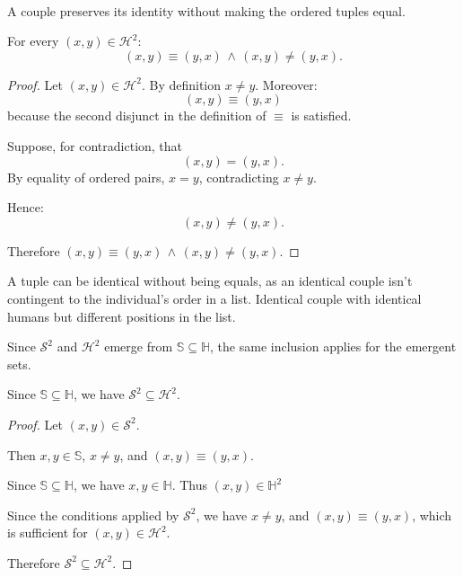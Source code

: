\begin{theorem}\label{sec:en:theorem:order-theorem}
    \leavevmode\\
    A couple preserves its identity without making the ordered tuples equal.
    \begin{statement}
        For every $(x,y)\in\mathcal{H}^2$:
        $$(x,y)\equiv(y,x)\,\land\,(x,y)\neq(y,x).$$
    \end{statement}
    \begin{proof}
        Let $(x,y)\in\mathcal{H}^2$. By definition $x\neq y$. Moreover:
        $$(x,y)\equiv(y,x)$$
        because the second disjunct in the definition of $\equiv$ is satisfied.
        
        Suppose, for contradiction, that
        $$(x,y)=(y,x).$$
        By equality of ordered pairs, $x=y$, contradicting $x\neq y$.
        
        Hence:
        $$(x,y)\neq(y,x).$$

        Therefore $(x,y)\equiv(y,x)\,\land\,(x,y)\neq(y,x)$.
    \end{proof}
\end{theorem}

\begin{corollary}
    A tuple can be identical without being equals, as an identical couple isn't contingent to the individual's order in a list. Identical couple with identical humans but different positions in the list.
\end{corollary}

\begin{theorem}\label{sec:en:theorem:single-set-inclusion}
    Since $\mathcal{S}^2$ and $\mathcal{H}^2$ emerge from $\mathbb{S}\subseteq\mathbb{H}$, the same inclusion applies for the emergent sets.
    \begin{statement}
        Since $\mathbb{S}\subseteq\mathbb{H}$, we have $\mathcal{S}^2\subseteq\mathcal{H}^2$.
    \end{statement}
    \begin{proof}
        Let $(x,y)\in\mathcal{S}^2$.
        
        Then $x,y\in\mathbb{S}$, $x\neq y$, and $(x,y)\equiv(y,x)$.
        
        Since $\mathbb{S}\subseteq\mathbb{H}$, we have $x,y\in\mathbb{H}$. Thus $(x,y)\in\mathbb{H}^2$
        
        Since the conditions applied by $\mathcal{S}^2$, we have $x\neq y$, and $(x,y)\equiv(y,x)$, which is sufficient for $(x,y)\in\mathcal{H}^2$.

        Therefore $\mathcal{S}^2\subseteq\mathcal{H}^2$.
    \end{proof}
\end{theorem}

